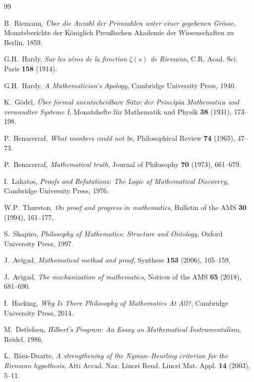 \documentclass[11pt,a4paper]{article}
\begin{document}


\begin{thebibliography}{99}

B.~Riemann, \emph{\"Uber die Anzahl der Primzahlen unter einer
gegebenen Gr\"osse}, Monatsberichte der K\"oniglich Preu\ss ischen
Akademie der Wissenschaften zu Berlin, 1859.

G.H.~Hardy, \emph{Sur les z\'eros de la fonction $\zeta(s)$ de
Riemann}, C.R. Acad. Sci. Paris \textbf{158} (1914).

G.H.~Hardy, \emph{A Mathematician's Apology}, Cambridge University
Press, 1940.

K.~G\"odel, \emph{\"Uber formal unentscheidbare S\"atze der
Principia Mathematica und verwandter Systeme I}, Monatshefte f\"ur
Mathematik und Physik \textbf{38} (1931), 173--198.

P.~Benacerraf, \emph{What numbers could not be}, Philosophical
Review \textbf{74} (1965), 47--73.

P.~Benacerraf, \emph{Mathematical truth}, Journal of Philosophy
\textbf{70} (1973), 661--679.

I.~Lakatos, \emph{Proofs and Refutations: The Logic of Mathematical
Discovery}, Cambridge University Press, 1976.

W.P.~Thurston, \emph{On proof and progress in mathematics}, Bulletin
of the AMS \textbf{30} (1994), 161--177.

S.~Shapiro, \emph{Philosophy of Mathematics: Structure and Ontology},
Oxford University Press, 1997.

J.~Avigad, \emph{Mathematical method and proof}, Synthese
\textbf{153} (2006), 105--159.

J.~Avigad, \emph{The mechanization of mathematics}, Notices of the
AMS \textbf{65} (2018), 681--690.

I.~Hacking, \emph{Why Is There Philosophy of Mathematics At All?},
Cambridge University Press, 2014.

M.~Detlefsen, \emph{Hilbert's Program: An Essay on Mathematical
Instrumentalism}, Reidel, 1986.

L.~B\'aez-Duarte, \emph{A strengthening of the Nyman--Beurling
criterion for the Riemann hypothesis}, Atti Accad. Naz. Lincei
Rend. Lincei Mat. Appl. \textbf{14} (2003), 5--11.


\end{thebibliography}
\end{document}
